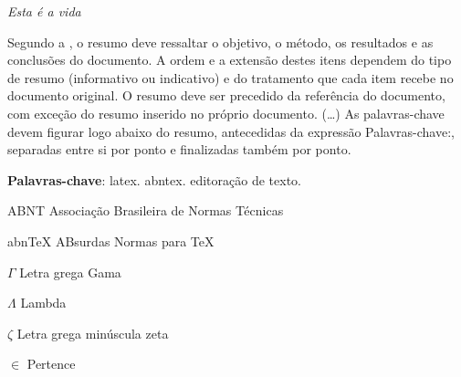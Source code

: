 \documentclass[
	12pt,				%
	openright,			%
	twoside,			%
	a4paper,			%
	english,			%
	]{abntex2}
\newcommand{\listofquadrosname}{Lista de quadros}
\begin{document}
\begin{epigrafe}
    \vspace*{\fill}
	\begin{flushright}
		\textit{Esta é a vida}
	\end{flushright}
\end{epigrafe}

\setlength{\absparsep}{18pt} %
\begin{resumo}
 Segundo a , o resumo deve ressaltar o
 objetivo, o método, os resultados e as conclusões do documento. A ordem e a extensão
 destes itens dependem do tipo de resumo (informativo ou indicativo) e do
 tratamento que cada item recebe no documento original. O resumo deve ser
 precedido da referência do documento, com exceção do resumo inserido no
 próprio documento. (\ldots) As palavras-chave devem figurar logo abaixo do
 resumo, antecedidas da expressão Palavras-chave:, separadas entre si por
 ponto e finalizadas também por ponto.

 \textbf{Palavras-chave}: latex. abntex. editoração de texto.
\end{resumo}


 


\listoffigures*
\cleardoublepage

\pdfbookmark[0]{\listofquadrosname}{loq}
\listofquadros*
\cleardoublepage

\listoftables*
\cleardoublepage

\begin{siglas}
  \item[ABNT] Associação Brasileira de Normas Técnicas
  \item[abnTeX] ABsurdas Normas para TeX
\end{siglas}

\begin{simbolos}
  \item[$ \Gamma $] Letra grega Gama
  \item[$ \Lambda $] Lambda
  \item[$ \zeta $] Letra grega minúscula zeta
  \item[$ \in $] Pertence
\end{simbolos}
\end{document}
